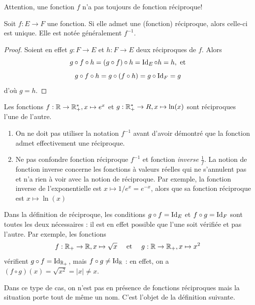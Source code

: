 Attention, une fonction $f$ n'a pas toujours de fonction réciproque!

\begin{proposition} Soit $f : E\to F$ une fonction. Si elle admet une (fonction) réciproque, alors celle-ci est unique. Elle est notée généralement $f^{-1}$.
\end{proposition}
\begin{proof}
Soient en effet $g : F\to E$ et $h : F \to E$ deux réciproques de $f$. Alors
\[
g\circ  f \circ h = (g\circ f) \circ h = \operatorname{Id}_E \circ h = h, \text{ et}
\]
\[
g\circ  f \circ h = g\circ (f \circ h) = g \circ \operatorname{Id}_F = g
\]
d'où $g=h$.
\end{proof}



\begin{exemple}
Les fonctions $f : \mathbb{R}\to \mathbb{R}_+^*, x\mapsto e^x$ et $g : \mathbb{R}_+^*\to R, x\mapsto \ln(x)$ sont réciproques l'une de l'autre.
\end{exemple}

\begin{attention}
\begin{enumerate}
\item On ne doit pas utiliser la notation $f^{-1}$ avant d'avoir démontré que la fonction admet effectivement une réciproque.
\item Ne pas confondre fonction réciproque $f^{-1}$ et fonction \emph{inverse} $\frac{1}{f}$. La notion de fonction inverse  concerne les fonctions à valeurs réelles qui ne s'annulent pas et n'a rien à voir avec la notion de réciproque. Par exemple, la fonction inverse de l'exponentielle est $x\mapsto 1/e^x = e^{-x}$, alors que sa fonction réciproque est $x\mapsto \ln(x)$
\end{enumerate}
\end{attention}

\begin{attention}
Dans la définition de réciproque, les conditions $g\circ f = \operatorname{Id}_E$ et  $f\circ g = \operatorname{Id}_F$ sont toutes les deux nécessaires : il est en effet possible que l'une soit vérifiée et pas l'autre. Par exemple, les fonctions 
\[
f : \mathbb{R}_+\to \mathbb{R}, x\mapsto \sqrt x
\quad \text{ et }\quad
g : \mathbb{R}\to \mathbb{R}_+, x\mapsto x^2
\]
vérifient $g\circ f=\operatorname{Id}_{\mathbb{R}_+}$, mais $f\circ g \neq \operatorname{Id}_{\mathbb{R}}$ : en effet, on a $(f\circ g)(x)=\sqrt{x^2}=|x|\neq x$.

Dans ce type de cas, on n'est pas en présence de fonctions réciproques mais la situation porte tout de même un nom. C'est l'objet de la définition suivante.
\end{attention}

